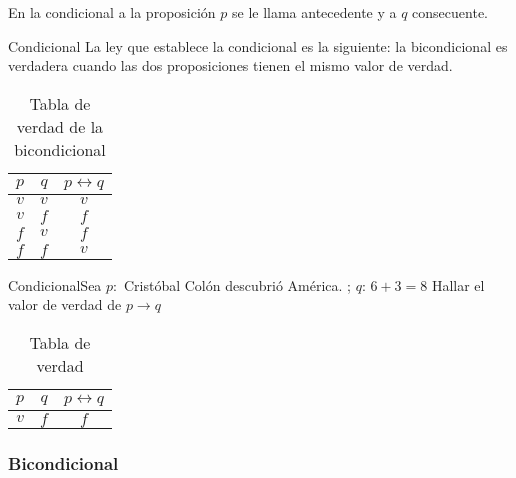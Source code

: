 \nota En la condicional a la proposición $p$ se le llama antecedente
y a $q$ consecuente.

\begin{definicionn}{ Condicional} La ley que establece la condicional
es la siguiente: la bicondicional es verdadera cuando las dos proposiciones
tienen el mismo valor de verdad.\end{definicionn}

\begin{table}[H]
\centering

\caption{Tabla de verdad de la bicondicional}


\setlength\arrayrulewidth{1pt} 

\begin{tabular}{c|c|c}
\arrayrulecolor{ptctitle}\hline\cellcolor{ptctitle!50}$p$ & \cellcolor{ptctitle!50}$q$ & \cellcolor{ptctitle!50}$p\longleftrightarrow q$\tabularnewline
\hline\cellcolor{ptcbackground}$v$ & \cellcolor{ptcbackground} $v$ & \cellcolor{ptcbackground}$v$\tabularnewline
\hline\cellcolor{gray!50}$v$ & \cellcolor{gray!50} $f$ & \cellcolor{gray!50}$f$\tabularnewline
\hline\cellcolor{ptcbackground}$f$ & \cellcolor{ptcbackground} $v$ & \cellcolor{ptcbackground}$f$\tabularnewline
\hline\cellcolor{gray!50}$f$ & \cellcolor{gray!50} $f$ & \cellcolor{gray!50}$v$\tabularnewline
\end{tabular}
\end{table}


\begin{ejem}{Condicional}Sea $p:$ Cristóbal Colón descubrió América.
; $q:\,6+3=8$ Hallar el valor de verdad de $p\rightarrow q$ \end{ejem}

\solucion 
\begin{table}[H]
\centering

\caption{Tabla de verdad}


\begin{tabular}{c|c|c}
\arrayrulecolor{ptctitle}\cellcolor{gray!50}$p$ & \cellcolor{gray!50}$q$ & \cellcolor{gray!50}$p\leftrightarrow q$\tabularnewline
\hline 
\cellcolor{ptcbackground}$v$ & \cellcolor{ptcbackground}$f$ & \cellcolor{ptcbackground}$f$\tabularnewline
\hline 
\end{tabular}
\end{table}



\subsubsection{Bicondicional}


